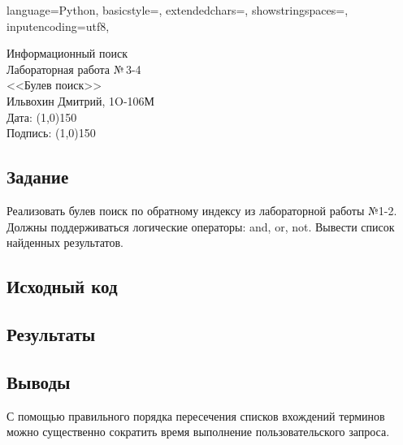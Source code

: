 \documentclass[12pt]{article}
\newcommand{\StudentName}{Ильвохин Дмитрий}
\newcommand{\Group}{1O-106М}
\newcommand{\CourseName}{Информационный поиск}
\newcommand{\LabNum}{3-4}
\newcommand{\Subject}{Булев поиск}
\begin{document}
\lstset
{
        language=Python,
        basicstyle=\footnotesize,%
        extendedchars=\true,
        showstringspaces=\false,
        inputencoding=utf8,
}

\begin{flushright}
\Large{
	\CourseName \\
	Лабораторная работа №\,\LabNum \\
	<<\Subject>> \\
  \StudentName, \Group \\
  Дата: \line(1,0){150} \\
  Подпись: \line(1,0){150} \\
}
\end{flushright}

\subsection*{Задание}
Реализовать булев поиск по обратному индексу из лабораторной работы №1-2.
Должны поддерживаться логические операторы: and, or, not.
Вывести список найденных результатов.

\subsection*{Исходный код}


\subsection*{Результаты}


\subsection*{Выводы}
С помощью правильного порядка пересечения списков вхождений терминов можно
существенно сократить время выполнение пользовательского запроса.
\end{document}
